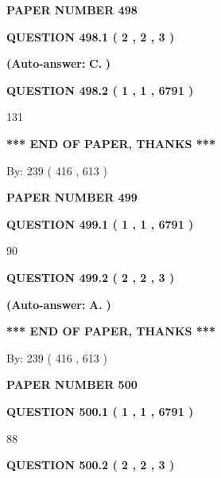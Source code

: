 \documentclass{ctexart}
\begin{document}
   
\newpage 
\setcounter{page}{ 
   498001 } 
   
   
 {\textbf{ \Large{ PAPER NUMBER  498  }}}
   
   
   
   
  
  
{\textbf{\large{QUESTION
498.1 
 ( 2 , 2 , 3 )
}}}
 
 
{\textbf{(Auto-answer:}}
{\textbf{\large{
C.}}}
{\textbf{)}}
 
 
  
  
{\textbf{\large{QUESTION
498.2 
 ( 1 , 1 , 6791 )
}}}

131
   
   
   
   
\vspace{1.0in} 
{\textbf{\large{ *** END OF PAPER, THANKS *** }}} 
   
   
\hspace{1.0in} By: 
 239 ( 416 ,  613 )
   
   
   
   
\newpage 
\setcounter{page}{ 
   499001 } 
   
   
 {\textbf{ \Large{ PAPER NUMBER  499  }}}
   
   
   
   
  
  
{\textbf{\large{QUESTION
499.1 
 ( 1 , 1 , 6791 )
}}}

90
  
  
{\textbf{\large{QUESTION
499.2 
 ( 2 , 2 , 3 )
}}}
 
 
{\textbf{(Auto-answer:}}
{\textbf{\large{
A.}}}
{\textbf{)}}
 
 
   
   
   
   
\vspace{1.0in} 
{\textbf{\large{ *** END OF PAPER, THANKS *** }}} 
   
   
\hspace{1.0in} By: 
 239 ( 416 ,  613 )
   
   
   
   
\newpage 
\setcounter{page}{ 
   500001 } 
   
   
 {\textbf{ \Large{ PAPER NUMBER  500  }}}
   
   
   
   
  
  
{\textbf{\large{QUESTION
500.1 
 ( 1 , 1 , 6791 )
}}}

88
  
  
{\textbf{\large{QUESTION
500.2 
 ( 2 , 2 , 3 )
}}}
 
\end{document}

